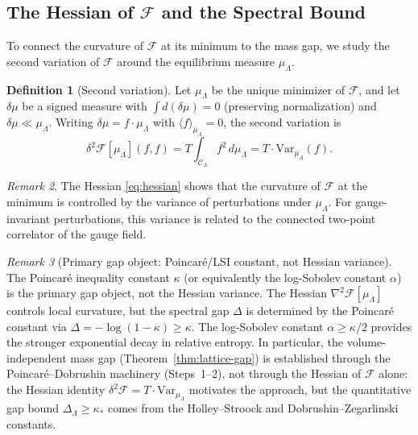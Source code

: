 \documentclass[12pt,a4paper]{article}
\theoremstyle{definition}
\newtheorem{definition}{Definition}[section]
\theoremstyle{plain}
\theoremstyle{remark}
\newtheorem{remark}[definition]{Remark}
\begin{document}
\subsection{The Hessian of \texorpdfstring{$\mathcal{F}$}{F} and the Spectral Bound}

To connect the curvature of $\mathcal{F}$ at its minimum to the mass gap, we study the second variation of $\mathcal{F}$ around the equilibrium measure $\mu_\Lambda$.

\begin{definition}[Second variation]
\label{def:second-variation}
Let $\mu_\Lambda$ be the unique minimizer of $\mathcal{F}$, and let $\delta\mu$ be a signed measure with $\int d(\delta\mu) = 0$ (preserving normalization) and $\delta\mu \ll \mu_\Lambda$. Writing $\delta\mu = f \cdot \mu_\Lambda$ with $\langle f \rangle_{\mu_\Lambda} = 0$, the second variation is
\begin{equation}\label{eq:hessian}
    \delta^2 \mathcal{F}[\mu_\Lambda](f,f) = T \int_{\mathcal{C}_\Lambda} f^2\, d\mu_\Lambda = T \cdot \mathrm{Var}_{\mu_\Lambda}(f).
\end{equation}
\end{definition}

\begin{remark}
The Hessian \eqref{eq:hessian} shows that the curvature of $\mathcal{F}$ at the minimum is controlled by the variance of perturbations under $\mu_\Lambda$. For gauge-invariant perturbations, this variance is related to the connected two-point correlator of the gauge field.
\end{remark}

\begin{remark}[Primary gap object: Poincar\'e/LSI constant, not Hessian variance]
\label{rem:primary-gap-object}
The Poincar\'e inequality constant $\kappa$ (or equivalently the log-Sobolev constant $\alpha$) is the primary gap object, not the Hessian variance. The Hessian $\nabla^2 \mathcal{F}[\mu_\Lambda]$ controls local curvature, but the spectral gap $\Delta$ is determined by the Poincar\'e constant via $\Delta = -\log(1-\kappa) \geq \kappa$. The log-Sobolev constant $\alpha \geq \kappa/2$ provides the stronger exponential decay in relative entropy. In particular, the volume-independent mass gap (Theorem~\ref{thm:lattice-gap}) is established through the Poincar\'e--Dobrushin machinery (Steps~1--2), not through the Hessian of $\mathcal{F}$ alone: the Hessian identity $\delta^2 \mathcal{F} = T \cdot \mathrm{Var}_{\mu_\Lambda}$ motivates the approach, but the quantitative gap bound $\Delta_\Lambda \geq \kappa_*$ comes from the Holley--Stroock and Dobrushin--Zegarlinski constants.
\end{remark}
\end{document}
